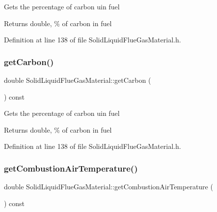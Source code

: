 Gets the percentage of carbon uin fuel \begin{DoxyReturn}{Returns}
double, \% of carbon in fuel 
\end{DoxyReturn}


Definition at line 138 of file Solid\+Liquid\+Flue\+Gas\+Material.\+h.

\mbox{\label{class_solid_liquid_flue_gas_material_a7b8a98111943d30094e2d6950f7f2ec1}} 
\subsubsection{\texorpdfstring{get\+Carbon()}{getCarbon()}\hspace{0.1cm}{\footnotesize\ttfamily [3/3]}}
{\footnotesize\ttfamily double Solid\+Liquid\+Flue\+Gas\+Material\+::get\+Carbon (\begin{DoxyParamCaption}{ }\end{DoxyParamCaption}) const\hspace{0.3cm}{\ttfamily [inline]}}

Gets the percentage of carbon uin fuel \begin{DoxyReturn}{Returns}
double, \% of carbon in fuel 
\end{DoxyReturn}


Definition at line 138 of file Solid\+Liquid\+Flue\+Gas\+Material.\+h.

\mbox{\label{class_solid_liquid_flue_gas_material_a8757b831e5a2ef26dbb0cf271c0e8207}} 
\subsubsection{\texorpdfstring{get\+Combustion\+Air\+Temperature()}{getCombustionAirTemperature()}\hspace{0.1cm}{\footnotesize\ttfamily [1/3]}}
{\footnotesize\ttfamily double Solid\+Liquid\+Flue\+Gas\+Material\+::get\+Combustion\+Air\+Temperature (\begin{DoxyParamCaption}{ }\end{DoxyParamCaption}) const\hspace{0.3cm}{\ttfamily [inline]}}


